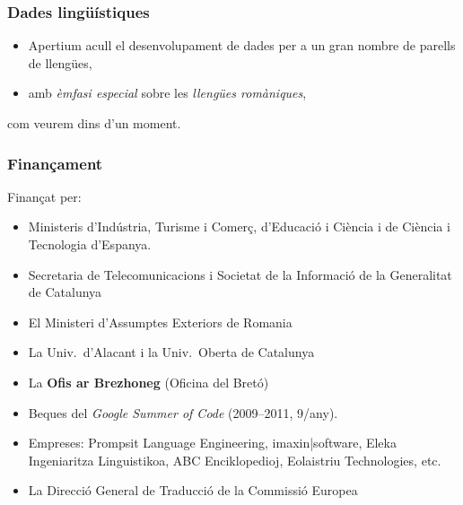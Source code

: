 \documentclass{beamer}
\newcommand{\empha}[1]{\emph{#1}\/}
\begin{document}

\begin{frame}
\frametitle{Dades lingüístiques}
\begin{itemize}
\item Apertium acull el desenvolupament de dades per a un gran nombre de parells de llengües,
\item  amb \empha{èmfasi especial} sobre les \empha{llengües romàniques}, 
\end{itemize}
com veurem dins d'un moment.
\end{frame}



\begin{frame}
\frametitle{Finançament}
Finançat per: 
\begin{itemize}
\item Ministeris d'Indústria, Turisme i Comerç, d'Educació i Ciència i  de Ciència i Tecnologia d'Espanya.
\item Secretaria de Telecomunicacions i Societat de la Informació de la Generalitat de Catalunya
\item El Ministeri d'Assumptes Exteriors de Romania
\item La Univ.\ d'Alacant i la Univ.\ Oberta de Catalunya
\item La \textbf{Ofis ar Brezhoneg} (Oficina del Bretó)
\item Beques del \empha{Google Summer of Code} (2009--2011, 9/any).
\item Empreses: Prompsit Language Engineering, imaxin|software, Eleka
  Ingeniaritza Linguistikoa, ABC Enciklopedioj, Eolaistriu   Technologies, etc.
\item La Direcció General de Traducció de la Commissió Europea
\end{itemize} 
\end{frame}
\end{document}
